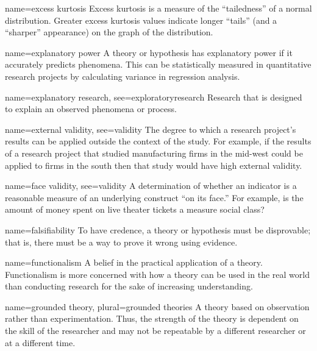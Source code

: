 {name={excess kurtosis}}
{%
	Excess kurtosis is a measure of the ``tailedness'' of a normal distribution. Greater excess kurtosis values indicate longer ``tails'' (and a ``sharper'' appearance) on the graph of the distribution.
}

{name={explanatory power}}
{%
	A theory or hypothesis has explanatory power if it accurately predicts phenomena. This can be statistically measured in quantitative research projects by calculating variance in regression analysis.
}

{name={explanatory research},
	see={exploratoryresearch}}
{%
	Research that is designed to explain an observed phenomena or process. 
}


{name={external validity},
	see={validity}}
{%
	The degree to which a research project's results can be applied outside the context of the study. For example, if the results of a research project that studied manufacturing firms in the mid-west could be applied to firms in the south then that study would have high external validity.
}

{name={face validity},
	see={validity}}
{%
	A determination of whether an indicator is a reasonable measure of an underlying construct ``on its face.'' For example, is the amount of money spent on live theater tickets a measure social class?
}

{name={falsifiability}}
{%
	To have credence, a theory or hypothesis must be disprovable; that is, there must be a way to prove it wrong using evidence.
}

{name={functionalism}}
{%
	A belief in the practical application of a theory. Functionalism is more concerned with how a theory can be used in the real world than conducting	research for the sake of increasing understanding. 
}

{name={grounded theory},
	plural={grounded theories}}
{%
	A theory based on observation rather than experimentation. Thus, the strength of the theory is dependent on the skill of the researcher and may not be repeatable by a different researcher or at a different time.
}

